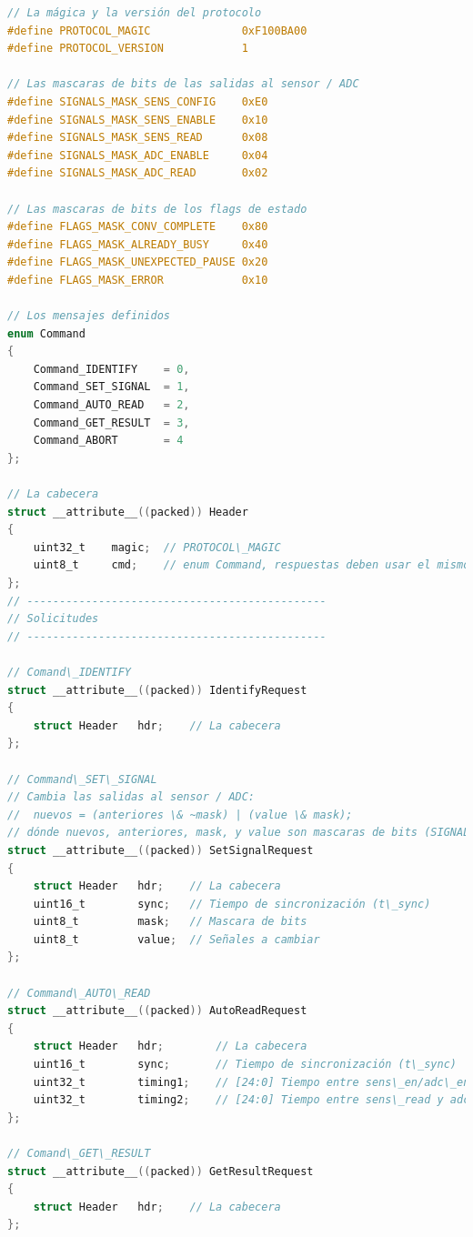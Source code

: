 \documentclass[a4paper, twoside, 11pt]{report}
\begin{document}
\begin{lstlisting}[language=C, style=CStyle, texcl=true]
// La mágica y la versión del protocolo
#define PROTOCOL_MAGIC              0xF100BA00
#define PROTOCOL_VERSION            1

// Las mascaras de bits de las salidas al sensor / ADC
#define SIGNALS_MASK_SENS_CONFIG    0xE0
#define SIGNALS_MASK_SENS_ENABLE    0x10
#define SIGNALS_MASK_SENS_READ      0x08
#define SIGNALS_MASK_ADC_ENABLE     0x04
#define SIGNALS_MASK_ADC_READ       0x02

// Las mascaras de bits de los flags de estado
#define FLAGS_MASK_CONV_COMPLETE    0x80
#define FLAGS_MASK_ALREADY_BUSY     0x40
#define FLAGS_MASK_UNEXPECTED_PAUSE 0x20
#define FLAGS_MASK_ERROR            0x10

// Los mensajes definidos
enum Command
{
    Command_IDENTIFY    = 0,
    Command_SET_SIGNAL  = 1,
    Command_AUTO_READ   = 2,
    Command_GET_RESULT  = 3,
    Command_ABORT       = 4
};

// La cabecera
struct __attribute__((packed)) Header
{
    uint32_t    magic;  // PROTOCOL\_MAGIC
    uint8_t     cmd;    // enum Command, respuestas deben usar el mismo que el solicitud
};
// ----------------------------------------------
// Solicitudes
// ----------------------------------------------

// Comand\_IDENTIFY
struct __attribute__((packed)) IdentifyRequest
{
    struct Header   hdr;    // La cabecera
};

// Command\_SET\_SIGNAL
// Cambia las salidas al sensor / ADC:
//  nuevos = (anteriores \& ~mask) | (value \& mask);
// dónde nuevos, anteriores, mask, y value son mascaras de bits (SIGNALS\_MASK\_...)
struct __attribute__((packed)) SetSignalRequest
{
    struct Header   hdr;    // La cabecera
    uint16_t        sync;   // Tiempo de sincronización (t\_sync)
    uint8_t         mask;   // Mascara de bits
    uint8_t         value;  // Señales a cambiar
};

// Command\_AUTO\_READ
struct __attribute__((packed)) AutoReadRequest
{
    struct Header   hdr;        // La cabecera
    uint16_t        sync;       // Tiempo de sincronización (t\_sync)
    uint32_t        timing1;    // [24:0] Tiempo entre sens\_en/adc\_en y sens\_read
    uint32_t        timing2;    // [24:0] Tiempo entre sens\_read y adc\_read
};

// Comand\_GET\_RESULT
struct __attribute__((packed)) GetResultRequest
{
    struct Header   hdr;    // La cabecera
};


\end{lstlisting}
\end{document}
